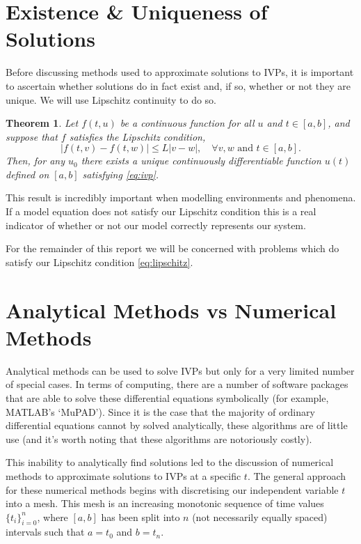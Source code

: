 \documentclass[12pt, twoside]{report}
\theoremstyle{plain}
\newtheorem{theorem}{Theorem}[chapter]
\theoremstyle{definition}
\theoremstyle{definition}
\providecommand{\abs}[1]{\lvert#1\rvert}
\begin{document}
    \section{Existence \& Uniqueness of Solutions}
    \label{1_existence}
        Before discussing methods used to approximate solutions to IVPs, it is
        important to ascertain whether solutions do in fact exist and, if so,
        whether or not they are unique. We will use Lipschitz continuity to do
        so.
        \begin{theorem}
            Let $f(t,u)$ be a continuous function for all $u$ and $t \in 
            [a, b]$, and suppose that $f$ satisfies the Lipschitz condition,
            \begin{equation}
            \label{eq:lipschitz}
                \abs{f(t,v)-f(t,w)} \le L\abs{v-w},
                \quad \forall v, w \text{ and } t \in [a,b].
            \end{equation}
            Then, for any $u_0$ there exists a unique continuously
            differentiable function $u(t)$ defined on $[a,b]$ satisfying
            \eqref{eq:ivp}.
        \end{theorem}
        This result is incredibly important when modelling environments and 
        phenomena. If a model equation does not satisfy our Lipschitz condition
        this is a real indicator of whether or not our model correctly 
        represents our system.

        For the remainder of this report we will be concerned with problems 
        which do satisfy our Lipschitz condition \eqref{eq:lipschitz}.


    \section{Analytical Methods vs Numerical Methods}
    \label{1_analytical_numerical}
        Analytical methods can be used to solve IVPs but only for a very limited
        number of special cases. In terms of computing, there are a number of 
        software packages that are able to solve these differential equations
        symbolically (for example, MATLAB's `MuPAD'). Since it is the case that
        the majority of ordinary differential equations cannot by solved 
        analytically, these algorithms are of little use (and it's worth noting
        that these algorithms are notoriously costly).

        This inability to analytically find solutions led to the discussion of
        numerical methods to approximate solutions to IVPs at a specific $t$. 
        The general approach for these numerical methods begins with 
        discretising our independent variable $t$ into a mesh. This mesh is an 
        increasing monotonic sequence of time values ${\lbrace 
        t_i\rbrace}_{i=0}^n$, where $[a,b]$ has been split into $n$ (not 
        necessarily equally spaced) intervals such that $a=t_0$ and $b=t_n$.
\end{document}
